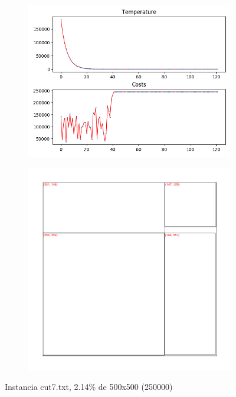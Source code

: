 \begin{figure}
\centering
\begin{subfigure}{.5\textwidth}
  \centering
  \includegraphics[width=1\linewidth]{results/cut7/1/plot}
  \label{fig:sub1}
\end{subfigure}%
\begin{subfigure}{.5\textwidth}
  \centering
  \includegraphics[width=1\linewidth]{results/cut7/1/cut}
  \label{fig:sub2}
\end{subfigure}
\caption{Instancia cut7.txt, 2.14\% de 500x500 (250000)}
\label{fig:test}
\end{figure}


